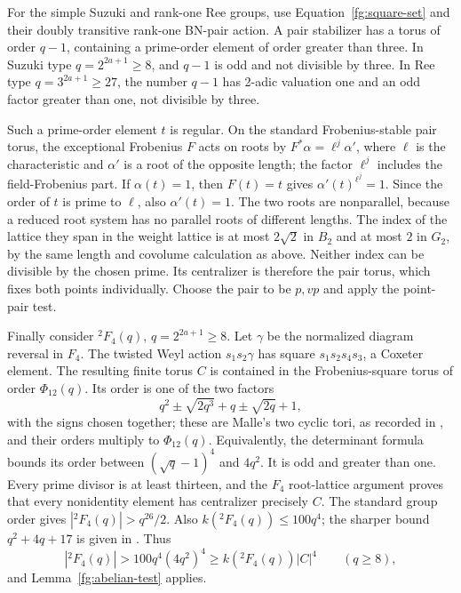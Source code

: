 For the simple Suzuki and rank-one Ree groups, use
Equation~\eqref{fg:square-set} and their doubly transitive
rank-one BN-pair action. A pair stabilizer has a torus of order
$q-1$, containing a prime-order element of order greater than
three. In Suzuki type $q=2^{2a+1}\ge8$, and $q-1$ is odd and not
divisible by three. In Ree type $q=3^{2a+1}\ge27$, the number
$q-1$ has 2-adic valuation one and an odd factor greater than one,
not divisible by three.

Such a prime-order element $t$ is regular. On the standard
Frobenius-stable pair torus, the exceptional Frobenius $F$ acts
on roots by $F^*\alpha=\ell^j\alpha'$, where $\ell$ is the
characteristic and $\alpha'$ is a root of the opposite length;
the factor $\ell^j$ includes the field-Frobenius part.
If $\alpha(t)=1$, then $F(t)=t$ gives
$\alpha'(t)^{\ell^j}=1$. Since the order of $t$ is prime to
$\ell$, also $\alpha'(t)=1$. The two roots are nonparallel,
because a reduced root system has no parallel roots of different
lengths. The index of the
lattice they span in the weight lattice is at most $2\sqrt2$
in $B_2$ and at most $2$ in $G_2$, by the same length and
covolume calculation as above. Neither index can be divisible
by the chosen prime. Its centralizer is therefore the pair torus,
which fixes both points individually. Choose the pair to be
$p,vp$ and apply the point-pair test.

Finally consider ${}^2F_4(q)$, $q=2^{2a+1}\ge8$. Let $\gamma$ be
the normalized diagram reversal in $F_4$. The twisted Weyl
action $s_1s_2\gamma$ has square $s_1s_2s_4s_3$, a Coxeter
element. The resulting finite torus $C$ is contained in the
Frobenius-square torus of order $\Phi_{12}(q)$. Its order is one
of the two factors
\[
 q^2\pm\sqrt{2q^3}+q\pm\sqrt{2q}+1,
\]
with the signs chosen together; these are Malle's two cyclic tori,
as recorded in \cite[Theorem~8]{GarionLarsenLubotzky}, and their
orders multiply to $\Phi_{12}(q)$. Equivalently, the
determinant formula bounds its order between
$(\sqrt q-1)^4$ and $4q^2$. It is odd and greater than one.
Every prime divisor is at least thirteen, and the $F_4$
root-lattice argument proves that every nonidentity element
has centralizer precisely $C$. The standard group order gives
$|{}^2F_4(q)|>q^{26}/2$. Also
$k({}^2F_4(q))\le100q^4$; the sharper bound
$q^2+4q+17$ is given in \cite[Table~1, p.~3049]{FulmanGuralnick}.
Thus
\[
 |{}^2F_4(q)|>100q^4(4q^2)^4\ge k({}^2F_4(q))|C|^4
 \qquad(q\ge8),
\]
and Lemma~\ref{fg:abelian-test} applies.


